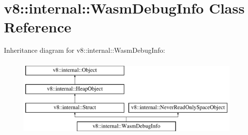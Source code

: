 \hypertarget{classv8_1_1internal_1_1WasmDebugInfo}{}\section{v8\+:\+:internal\+:\+:Wasm\+Debug\+Info Class Reference}
\label{classv8_1_1internal_1_1WasmDebugInfo}
Inheritance diagram for v8\+:\+:internal\+:\+:Wasm\+Debug\+Info\+:\begin{figure}[H]
\begin{center}
\leavevmode
\includegraphics[height=4.000000cm]{classv8_1_1internal_1_1WasmDebugInfo}
\end{center}
\end{figure}
